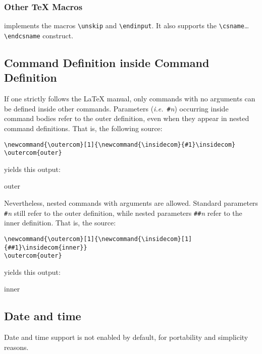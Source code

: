 \subsubsection{Other \TeX{} Macros}
\hevea{} implements the macros \verb+\unskip+ and \verb+\endinput+.
It also supports the \verb+\csname+\ldots{} \verb+\endcsname+
construct.


\subsection{Command Definition inside Command Definition}
If one strictly follows the \LaTeX{} manual, only commands with no
arguments can be defined inside other commands.
Parameters (\emph{i.e.}\ \verb+#+\textit{n}) occurring inside command bodies
refer to the outer definition, even when they appear in nested
command definitions.
That is, the following source:
\begin{verbatim}
\newcommand{\outercom}[1]{\newcommand{\insidecom}{#1}\insidecom}
\outercom{outer}
\end{verbatim}
yields this output:
\begin{center}
\newcommand{\outercom}[1]{\newcommand{\insidecom}{#1}\insidecom}
\outercom{outer}
\end{center}

Nevertheless, nested commands with arguments are allowed.
Standard parameters \verb+#+\textit{n} still refer to the outer
definition, while nested parameters \verb+##+\textit{n} refer to the
inner definition.
That is, the source:
\begin{verbatim}
\newcommand{\outercom}[1]{\newcommand{\insidecom}[1]{##1}\insidecom{inner}}
\outercom{outer}
\end{verbatim}
yields this output:
\begin{center}
\newcommand{\outercom}[1]{\newcommand{\insidecom}[1]{##1}\insidecom{inner}}
\outercom{outer}
\end{center}

\subsection{Date and time}
Date and time support is not enabled by default, for portability and
simplicity reasons.


